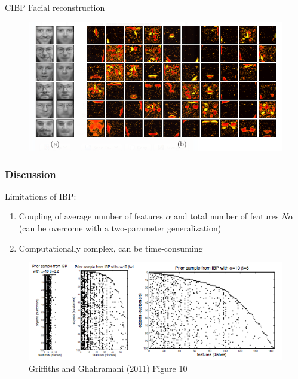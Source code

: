 \documentclass[13pt]{beamer}
\begin{document}
\begin{frame}{CIBP Facial reconstruction}
\begin{figure}
\begin{center}
\includegraphics[scale=0.6]{./img/cibp-reconstructions.png}
\end{center}
\end{figure}
\end{frame}
\begin{frame}
\frametitle{Discussion}


Limitations of IBP:
\begin{enumerate}
\item Coupling of average number of features $\alpha$ and total number of features $N\alpha$ (can be overcome with a two-parameter generalization)
\item Computationally complex, can be time-consuming
\end{enumerate}

\begin{figure}
\begin{center}
\includegraphics[scale=0.3]{./img/two-parameter-ibp.png}
\caption{Griffiths and Ghahramani (2011) Figure 10}
\end{center}
\end{figure}

\end{frame}
 
\end{document}
